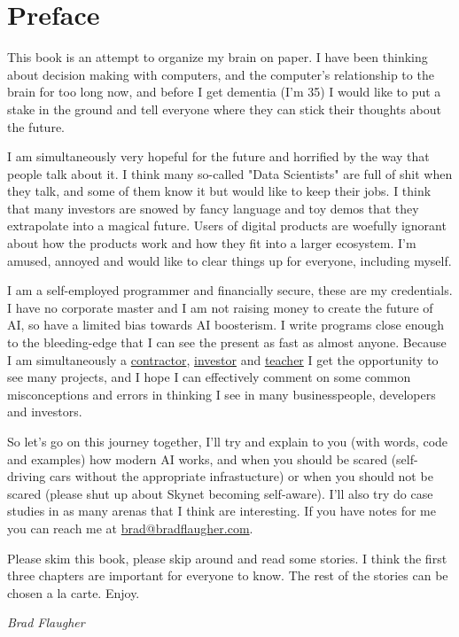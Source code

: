\chapter*{Preface}

This book is an attempt to organize my brain on paper. I have been thinking about decision making with computers, and the computer's relationship to the brain for too long now, and before I get dementia (I'm 35) I would like to put a stake in the ground and tell everyone where they can stick their thoughts about the future. 

I am simultaneously very hopeful for the future and horrified by the way that people talk about it. I think many so-called "Data Scientists" are full of shit when they talk, and some of them know it but would like to keep their jobs. I think that many investors are snowed by fancy language and toy demos that they extrapolate into a magical future. Users of digital products are woefully ignorant about how the products work and how they fit into a larger ecosystem. I'm amused, annoyed and would like to clear things up for everyone, including myself.

I am a self-employed programmer and financially secure, these are my credentials. I have no corporate master and I am not raising money to create the future of AI, so have a limited bias towards AI boosterism. I write programs close enough to the bleeding-edge that I can see the present as fast as almost anyone. Because I am simultaneously a \href{https://inoxoft.com/}{contractor}, \href{https://ventures.nextfab.com/about/}{investor} and \href{https://bradflaugher.com/bootcamp.html}{teacher} I get the opportunity to see many projects, and I hope I can effectively comment on some common misconceptions and errors in thinking I see in many businesspeople, developers and investors.

So let's go on this journey together, I'll try and explain to you (with words, code and examples) how modern AI works, and when you should be scared (self-driving cars without the appropriate infrastucture) or when you should not be scared (please shut up about Skynet becoming self-aware). I'll also try do case studies in as many arenas that I think are interesting. If you have notes for me you can reach me at \href{mailto:brad@bradflaugher.com}{brad@bradflaugher.com}.

Please skim this book, please skip around and read some stories. I think the first three chapters are important for everyone to know. The rest of the stories can be chosen a la carte. Enjoy.

\begin{flushright}
	\textit{Brad Flaugher}
\end{flushright}
